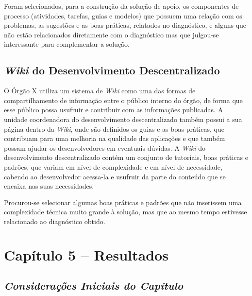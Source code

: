 Foram selecionados, para a construção da solução de apoio, os componentes de processo (atividades, tarefas, guias e modelos) que possuem uma relação com os problemas, as sugestões e as boas práticas, relatados no diagnóstico, e alguns que não estão relacionados diretamente com o diagnóstico mas que julgou-se interessante para complementar a solução.

\section{\textit{Wiki} do Desenvolvimento Descentralizado}

O Órgão X utiliza um sistema de \textit{Wiki} como uma das formas de compartilhamento de informação entre o público interno do órgão, de forma que esse público possa usufruir e contribuir com as informações publicadas. A unidade coordenadora do desenvolvimento descentralizado também possui a sua página dentro da \textit{Wiki}, onde são definidos os guias e as boas práticas, que contribuam para uma melhoria na qualidade das aplicações e que também possam ajudar os desenvolvedores em eventuais dúvidas. A \textit{Wiki} do desenvolvimento descentralizado contém um conjunto de tutoriais, boas práticas e padrões, que variam em nível de complexidade e em nível de necessidade, cabendo ao desenvolvedor acessa-la e usufruir da parte do conteúdo que se encaixa nas suas necessidades.

Procurou-se selecionar algumas boas práticas e padrões que não inserissem uma complexidade técnica muito grande à solução, mas que ao mesmo tempo estivesse relacionado ao diagnóstico obtido.

\chapter[Capítulo 5]{Capítulo 5 – Resultados}

\section{\textit{Considerações Iniciais do Capítulo}}

